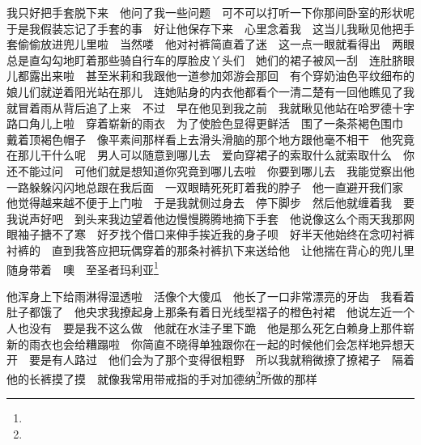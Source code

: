 \par 我只好把手套脱下来　他问了我一些问题　可不可以打听一下你那间卧室的形状呢　于是我假装忘记了手套的事　好让他保存下来　心里念着我　这当儿我瞅见他把手套偷偷放进兜儿里啦　当然喽　他对衬裤简直着了迷　这一点一眼就看得出　两眼总是直勾勾地盯着那些骑自行车的厚脸皮丫头们　她们的裙子被风一刮　连肚脐眼儿都露出来啦　甚至米莉和我跟他一道参加郊游会那回　有个穿奶油色平纹细布的娘儿们就逆着阳光站在那儿　连她贴身的内衣他都看个一清二楚有一回他瞧见了我　就冒着雨从背后追了上来　不过　早在他见到我之前　我就瞅见他站在哈罗德十字路口角儿上啦　穿着崭新的雨衣　为了使脸色显得更鲜活　围了一条茶褐色围巾　戴着顶褐色帽子　像平素间那样看上去滑头滑脑的那个地方跟他毫不相干　他究竟在那儿干什么呢　男人可以随意到哪儿去　爱向穿裙子的索取什么就索取什么　你还不能过问　可他们就是想知道你究竟到哪儿去啦　你要到哪儿去　我能觉察出他一路躲躲闪闪地总跟在我后面　一双眼睛死死盯着我的脖子　他一直避开我们家　他觉得越来越不便于上门啦　于是我就侧过身去　停下脚步　然后他就缠着我　要我说声好吧　到头来我边望着他边慢慢腾腾地摘下手套　他说像这么个雨天我那网眼袖子搪不了寒　好歹找个借口来伸手挨近我的身子呗　好半天他始终在念叨衬裤衬裤的　直到我答应把玩偶穿着的那条衬裤扒下来送给他　让他揣在背心的兜儿里随身带着　噢　至圣者玛利亚\footnote{}　
\par 他浑身上下给雨淋得湿透啦　活像个大傻瓜　他长了一口非常漂亮的牙齿　我看着肚子都饿了　他央求我撩起身上那条有着日光线型褶子的橙色衬裙　他说左近一个人也没有　要是我不这么做　他就在水洼子里下跪　他是那么死乞白赖身上那件崭新的雨衣也会给糟蹋啦　你简直不晓得单独跟你在一起的时候他们会怎样地异想天开　要是有人路过　他们会为了那个变得很粗野　所以我就稍微撩了撩裙子　隔着他的长裤摸了摸　就像我常用带戒指的手对加德纳\footnote{}所做的那样　
